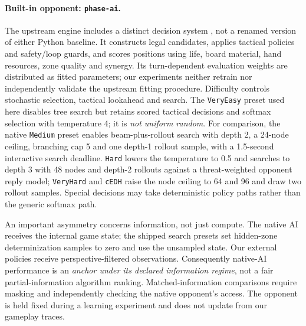 \documentclass[11pt,a4paper]{article}
\theoremstyle{definition}
\theoremstyle{plain}
\begin{document}
\paragraph{Built-in opponent: \texttt{phase-ai}.}
The upstream engine includes a distinct decision system \citep{phase2026engine},
not a renamed version of either Python baseline. It constructs legal
candidates, applies tactical policies and safety/loop guards, and scores
positions using life, board material, hand resources, zone quality and
synergy. Its turn-dependent evaluation weights are distributed as fitted
parameters; our experiments neither retrain nor independently validate the
upstream fitting procedure. Difficulty controls stochastic selection,
tactical lookahead and search. The \texttt{VeryEasy} preset used here disables
tree search but retains scored tactical decisions and softmax selection
with temperature 4; it is \emph{not uniform random}. For comparison,
the native \texttt{Medium} preset enables beam-plus-rollout search with
depth 2, a 24-node ceiling, branching cap 5 and one depth-1 rollout sample,
with a 1.5-second interactive search deadline. \texttt{Hard} lowers the
temperature to 0.5 and searches to depth 3 with 48 nodes and depth-2
rollouts against a threat-weighted opponent reply model; \texttt{VeryHard}
and \texttt{cEDH} raise the node ceiling to 64 and 96 and draw two rollout
samples. Special decisions may take
deterministic policy paths rather than the generic softmax path.

An important asymmetry concerns information, not just compute.
The native AI receives the internal game state; the shipped search presets
set hidden-zone determinization samples to zero and use the unsampled state.
Our external policies receive perspective-filtered observations.
Consequently native-AI performance is an \emph{anchor under its declared
information regime}, not a fair partial-information algorithm ranking.
Matched-information comparisons require masking and independently checking
the native opponent's access. The opponent is held fixed during a learning
experiment and does not update from our gameplay traces.
\end{document}
